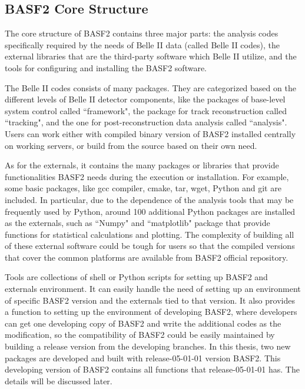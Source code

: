 \subsection{BASF2 Core Structure}
The core structure of BASF2 contains three major parts: the analysis codes specifically required by the needs of Belle II data (called Belle II codes), the external libraries that are the third-party software which Belle II utilize, and the tools for configuring and installing the BASF2 software. 

The Belle II codes consists of many packages. They are categorized based on the different levels of Belle II detector components, like the packages of base-level system control called ``framework", the package for track reconstruction called ``tracking", and the one for post-reconstruction data analysis called ``analysis".
Users can work either with compiled binary version of BASF2 installed centrally on working servers, or build from the source based on their own need. 

As for the externals, it contains the many packages or libraries that provide functionalities BASF2 needs during the execution or installation. For example, some basic packages, like gcc compiler, cmake, tar, wget, Python and git are included. In particular, due to the dependence of the analysis tools that may be frequently used by Python, around 100 additional Python packages are installed as the externals, such as ``Numpy" and ``matplotlib" package that provide functions for statistical calculations and plotting. The complexity of building all of these external software could be tough for users so that the compiled versions that cover the common platforms are available from BASF2 official repository. 

Tools are collections of shell or Python scripts for setting up BASF2 and externals environment. It can easily handle the need of setting up an environment of specific BASF2 version and the externals tied to that version. It also provides a function to setting up the environment of developing BASF2, where developers can get one developing copy of BASF2 and write the additional codes as the modification, so the compatibility of BASF2 could be easily maintained by building a release version from the developing branches. In this thesis, two new packages are developed and built with release-05-01-01 version BASF2. This developing version of BASF2 contains all functions that release-05-01-01 has. The details will be discussed later. 

